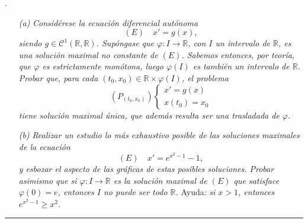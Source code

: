 \documentclass[11pt]{report}
\newcommand{\R}{\mathbb R}
\begin{document}
\vspace{4mm}

.
\begin{itemize}
    \item[\textit{(a)}] \textit{Considérese la ecuación diferencial autónoma}
    \[(E) \quad x'=g(x),\]
    \textit{siendo $g \in \mathcal{C}^1(\R,\R)$. Supóngase que $\varphi \colon I \to \R$, con $I$ un intervalo de $\R$, es una solución maximal no constante de $(E)$. Sabemos entonces, por teoría, que $\varphi$ es estrictamente monótona, luego $\varphi(I)$ es también un intervalo de $\R$. Probar que, para cada $(t_0,x_0) \in \R \times \varphi(I)$, el problema}
    \[(P_{(t_0,x_0)}) \begin{cases}
        x'=g(x) \\
        x(t_0)=x_0
    \end{cases}\]
    \textit{tiene solución maximal única, que además resulta ser una trasladada de $\varphi$.}
    \item[\textit{(b)}] \textit{Realizar un estudio lo más exhaustivo posible de las soluciones maximales de la ecuación
    \[(E) \quad x'=e^{x^2-1}-1,\]}
    \textit{y esbozar el aspecto de las gráficas de estas posibles soluciones. Probar asimismo que si $\varphi \colon I \to \R$ es la solución maximal de $(E)$ que satisface $\varphi(0)=e$, entonces $I$ no puede ser todo $\R$.} Ayuda: \textit{si $x >1$, entonces $e^{x^2-1} \geq x^2$}.
\end{itemize}

\vspace{2mm}

\hrule

\vspace{2mm}
\end{document}
